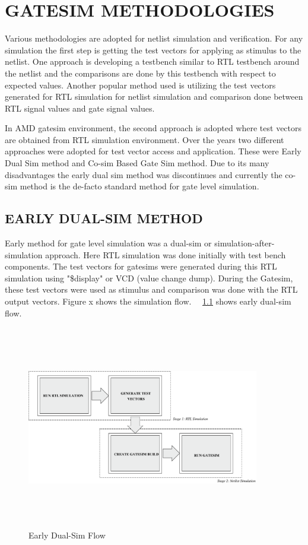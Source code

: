 \chapter{GATESIM METHODOLOGIES}
\label{chap:methodologies.tex}

Various methodologies are adopted for netlist simulation and verification. For any simulation the first step is getting the test vectors for applying as stimulus to the netlist. One approach is developing a testbench similar to RTL testbench around the netlist and the comparisons are done by this testbench with respect to expected values. Another popular method used is utilizing the test vectors generated for RTL simulation for netlist simulation and comparison done between RTL signal values and gate signal values. 

In AMD gatesim environment, the second approach is adopted where test vectors are obtained from RTL simulation environment. Over the years two different approaches were adopted for test vector access and application. These were Early Dual Sim method and Co-sim Based Gate Sim method. Due to its many disadvantages the early dual sim method was discontinues and currently the co-sim method is the de-facto standard method for gate level simulation.  


\section{EARLY DUAL-SIM METHOD}
 Early method for gate level simulation was a dual-sim or simulation-after- simulation approach. Here RTL simulation was done initially with test bench components. The test vectors for gatesims were generated during this RTL simulation using "\$display" or VCD (value change dump). During the Gatesim, these test vectors were used as stimulus and comparison was done with the RTL output vectors. Figure x shows the simulation flow. ~\figurename{~\ref{fig:earlydualsim.eps}} shows early dual-sim flow.

\begin{figure}[H]
\centering
\includegraphics[width=4in, height=3.5in]{./figures/earlydualsim.eps}
\caption{Early Dual-Sim Flow}
\label{fig:earlydualsim.eps}
\end{figure}

